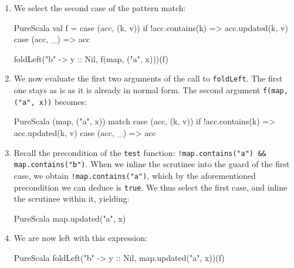 \documentclass[a4paper,twoside]{article}
\newcommand{\InlineS}[1]{\lstinline[language=PureScala,basicstyle=\small\ttfamily,columns=fixed]|#1|}
\newcommand{\stt}[1]{\texttt{\small{#1}}}
\begin{document}
\begin{enumerate}
\begin{ShortCode}{PureScala}
val f = {
  case (acc, (k, v)) if !acc.contains(k) => acc.updated(k, v)
  case (acc, _)                          => acc
}

(("a", x) :: ("b", y) :: Nil) match {
  case Nil     => map
  case x :: xs => foldLeft(xs, f(z, x))(f)
}
\end{ShortCode}

For legibility, we have assigned the supplied match expression to a variable instead of inlining it straight away.

\item We select the second case of the pattern match:

\begin{ShortCode}{PureScala}
val f = {
  case (acc, (k, v)) if !acc.contains(k) => acc.updated(k, v)
  case (acc, _)                          => acc
}

foldLeft("b" -> y :: Nil, f(map, ("a", x)))(f)
\end{ShortCode}

\item We now evaluate the first two arguments of the call to \stt{foldLeft}. The first one stays as is as it is already in normal form. The second argument \InlineS{f(map, ("a", x))} becomes:

\begin{ShortCode}{PureScala}
(map, ("a", x)) match {
  case (acc, (k, v)) if !acc.contains(k) => acc.updated(k, v)
  case (acc, _)                          => acc
}
\end{ShortCode}

\item Recall the precondition of the \stt{test} function: \InlineS{!map.contains("a") && map.contains("b")}. When we inline the scrutinee into the guard of the first case, we obtain \InlineS{!map.contains("a")}, which by the aforementioned precondition we can deduce is \InlineS{true}. We thus select the first case, and inline the scrutinee within it, yielding:

\begin{ShortCode}{PureScala}
map.updated("a", x)
\end{ShortCode}

\item We are now left with this expression:

\begin{ShortCode}{PureScala}
foldLeft("b" -> y :: Nil, map.updated("a", x))(f)
\end{ShortCode}


\end{enumerate}
\end{document}
